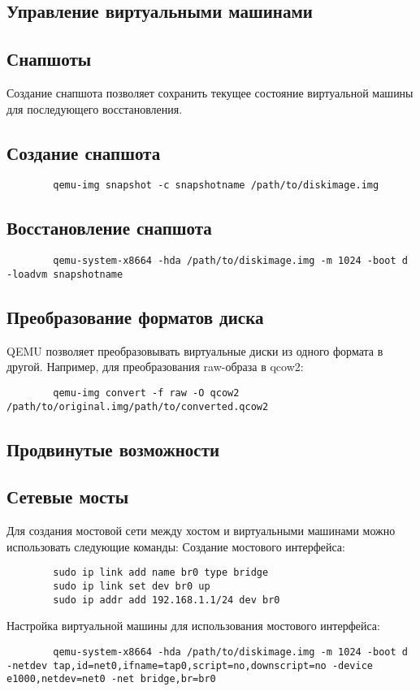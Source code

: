     \subsection{Управление виртуальными машинами}
    
    \subsection{Снапшоты}
    Создание снапшота позволяет сохранить текущее состояние виртуальной машины для последующего восстановления.

    \subsection{Создание снапшота}
    \begin{lstlisting}
        qemu-img snapshot -c snapshotname /path/to/diskimage.img
    \end{lstlisting}

    \subsection{Восстановление снапшота}
    \begin{lstlisting}
        qemu-system-x8664 -hda /path/to/diskimage.img -m 1024 -boot d -loadvm snapshotname
    \end{lstlisting}

    \subsection{Преобразование форматов диска}
    QEMU позволяет преобразовывать виртуальные диски из одного формата в другой. Например, для преобразования raw-образа в qcow2:
    \begin{lstlisting}
        qemu-img convert -f raw -O qcow2 /path/to/original.img/path/to/converted.qcow2
    \end{lstlisting}

    \subsection{Продвинутые возможности}

    \subsection{Сетевые мосты}
    Для создания мостовой сети между хостом и виртуальными машинами можно использовать следующие команды:
    Создание мостового интерфейса:
    \begin{lstlisting}
        sudo ip link add name br0 type bridge
        sudo ip link set dev br0 up
        sudo ip addr add 192.168.1.1/24 dev br0
    \end{lstlisting}
    Настройка виртуальной машины для использования мостового интерфейса:
    \begin{lstlisting}
        qemu-system-x8664 -hda /path/to/diskimage.img -m 1024 -boot d -netdev tap,id=net0,ifname=tap0,script=no,downscript=no -device e1000,netdev=net0 -net bridge,br=br0
    \end{lstlisting}

